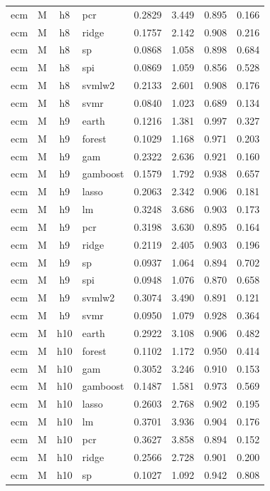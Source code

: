 \begin{ThreePartTable}
\begin{longtable}[t]{llclcccc}
ecm & M & h8 & pcr & 0.2829 & 3.449 & 0.895 & 0.166\\
ecm & M & h8 & ridge & 0.1757 & 2.142 & 0.908 & 0.216\\
ecm & M & h8 & sp & 0.0868 & 1.058 & 0.898 & 0.684\\
ecm & M & h8 & spi & 0.0869 & 1.059 & 0.856 & 0.528\\
ecm & M & h8 & svmlw2 & 0.2133 & 2.601 & 0.908 & 0.176\\
ecm & M & h8 & svmr & 0.0840 & 1.023 & 0.689 & 0.134\\
\addlinespace
ecm & M & h9 & earth & 0.1216 & 1.381 & 0.997 & 0.327\\
ecm & M & h9 & forest & 0.1029 & 1.168 & 0.971 & 0.203\\
ecm & M & h9 & gam & 0.2322 & 2.636 & 0.921 & 0.160\\
ecm & M & h9 & gamboost & 0.1579 & 1.792 & 0.938 & 0.657\\
ecm & M & h9 & lasso & 0.2063 & 2.342 & 0.906 & 0.181\\
ecm & M & h9 & lm & 0.3248 & 3.686 & 0.903 & 0.173\\
ecm & M & h9 & pcr & 0.3198 & 3.630 & 0.895 & 0.164\\
ecm & M & h9 & ridge & 0.2119 & 2.405 & 0.903 & 0.196\\
ecm & M & h9 & sp & 0.0937 & 1.064 & 0.894 & 0.702\\
ecm & M & h9 & spi & 0.0948 & 1.076 & 0.870 & 0.658\\
ecm & M & h9 & svmlw2 & 0.3074 & 3.490 & 0.891 & 0.121\\
ecm & M & h9 & svmr & 0.0950 & 1.079 & 0.928 & 0.364\\
\addlinespace
ecm & M & h10 & earth & 0.2922 & 3.108 & 0.906 & 0.482\\
ecm & M & h10 & forest & 0.1102 & 1.172 & 0.950 & 0.414\\
ecm & M & h10 & gam & 0.3052 & 3.246 & 0.910 & 0.153\\
ecm & M & h10 & gamboost & 0.1487 & 1.581 & 0.973 & 0.569\\
ecm & M & h10 & lasso & 0.2603 & 2.768 & 0.902 & 0.195\\
ecm & M & h10 & lm & 0.3701 & 3.936 & 0.904 & 0.176\\
ecm & M & h10 & pcr & 0.3627 & 3.858 & 0.894 & 0.152\\
ecm & M & h10 & ridge & 0.2566 & 2.728 & 0.901 & 0.200\\
ecm & M & h10 & sp & 0.1027 & 1.092 & 0.942 & 0.808\\

\end{longtable}
\end{ThreePartTable}
